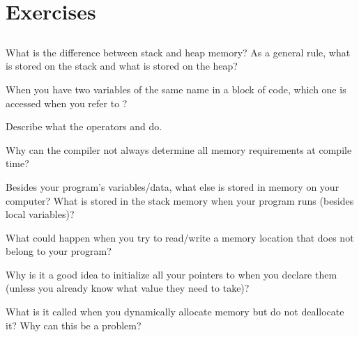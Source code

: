 \section{Exercises}

\subsection{\ReviewQuestions}

\begin{exercise}
  What is the difference between stack and heap memory?
  As a general rule, what is stored on the stack and what is stored on
  the heap?
\end{exercise}

\begin{exercise}
  When you have two variables of the same name  in a block of code,
  which one is accessed when you refer to ?
\end{exercise}

\begin{exercise}
  Describe what the operators \code{*} and \code{&} do.
\end{exercise}

\begin{exercise}
  Why can the compiler not always determine all memory requirements at
  compile time?
\end{exercise}

\begin{exercise}
  Besides your program's variables/data, what else is stored in
  memory on your computer? What is stored in the stack memory when
  your program runs (besides local variables)?
\end{exercise}

\begin{exercise}
  What could happen when you try to read/write a memory location that
  does not belong to your program?
\end{exercise}

\begin{exercise}
  Why is it a good idea to initialize all your pointers to
   when you declare them
  (unless you already know what value they need to take)?
\end{exercise}

\begin{exercise}
  What is it called when you dynamically allocate memory but do not
  deallocate it? Why can this be a problem?
\end{exercise}


